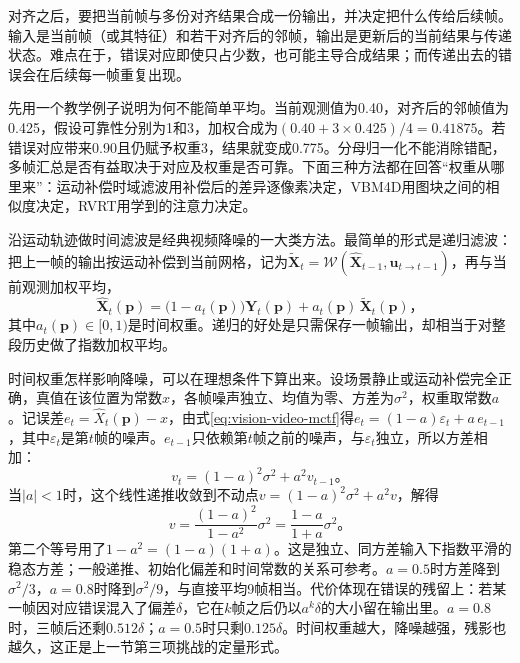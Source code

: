 对齐之后，要把当前帧与多份对齐结果合成一份输出，并决定把什么传给后续帧。输入是当前帧（或其特征）和若干对齐后的邻帧，输出是更新后的当前结果与传递状态。难点在于，错误对应即使只占少数，也可能主导合成结果；而传递出去的错误会在后续每一帧重复出现。

先用一个教学例子说明为何不能简单平均。当前观测值为0.40，对齐后的邻帧值为0.425，假设可靠性分别为1和3，加权合成为$(0.40+3\times0.425)/4=0.41875$。若错误对应带来0.90且仍赋予权重3，结果就变成0.775。分母归一化不能消除错配，多帧汇总是否有益取决于对应及权重是否可靠。下面三种方法都在回答“权重从哪里来”：运动补偿时域滤波用补偿后的差异逐像素决定，VBM4D用图块之间的相似度决定，RVRT用学到的注意力决定。

沿运动轨迹做时间滤波是经典视频降噪的一大类方法。最简单的形式是递归滤波：把上一帧的输出按运动补偿到当前网格，记为$\widetilde{\bm{X}}_t=\mathcal{W}(\widehat{\bm{X}}_{t-1},\bm{u}_{t\to t-1})$，再与当前观测加权平均，
\begin{equation}
  \widehat{\bm{X}}_t(\bm{p})=\bigl(1-a_t(\bm{p})\bigr)\bm{Y}_t(\bm{p})
    +a_t(\bm{p})\,\widetilde{\bm{X}}_t(\bm{p})\text{，}
  \label{eq:vision-video-mctf}
\end{equation}
其中$a_t(\bm{p})\in[0,1)$是时间权重。递归的好处是只需保存一帧输出，却相当于对整段历史做了指数加权平均。

时间权重怎样影响降噪，可以在理想条件下算出来。设场景静止或运动补偿完全正确，真值在该位置为常数$x$，各帧噪声独立、均值为零、方差为$\sigma^2$，权重取常数$a$。记误差$e_t=\widehat{X}_t(\bm{p})-x$，由式\eqref{eq:vision-video-mctf}得$e_t=(1-a)\varepsilon_t+a\,e_{t-1}$，其中$\varepsilon_t$是第$t$帧的噪声。$e_{t-1}$只依赖第$t$帧之前的噪声，与$\varepsilon_t$独立，所以方差相加：
\[
  v_t=(1-a)^2\sigma^2+a^2v_{t-1}\text{。}
\]
当$|a|<1$时，这个线性递推收敛到不动点$v=(1-a)^2\sigma^2+a^2v$，解得
\begin{equation}
  v=\frac{(1-a)^2}{1-a^2}\sigma^2=\frac{1-a}{1+a}\sigma^2\text{。}
  \label{eq:vision-video-mctf-variance}
\end{equation}
第二个等号用了$1-a^2=(1-a)(1+a)$。这是独立、同方差输入下指数平滑的稳态方差；一般递推、初始化偏差和时间常数的关系可参考。$a=0.5$时方差降到$\sigma^2/3$，$a=0.8$时降到$\sigma^2/9$，与直接平均9帧相当。代价体现在错误的残留上：若某一帧因对应错误混入了偏差$\delta$，它在$k$帧之后仍以$a^k\delta$的大小留在输出里。$a=0.8$时，三帧后还剩$0.512\delta$；$a=0.5$时只剩$0.125\delta$。时间权重越大，降噪越强，残影也越久，这正是上一节第三项挑战的定量形式。

